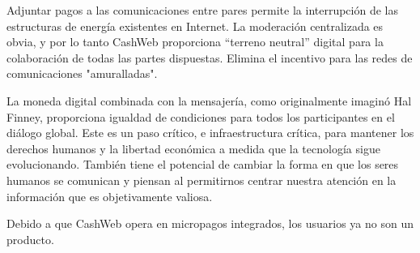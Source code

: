 \documentclass{article}
\begin{document}
Adjuntar pagos a las comunicaciones entre pares permite la interrupción de las estructuras de energía existentes en Internet. La moderación centralizada es obvia, y por lo tanto CashWeb proporciona ``terreno neutral'' digital para la colaboración de todas las partes dispuestas. Elimina el incentivo para las redes de comunicaciones "amuralladas".

La moneda digital combinada con la mensajería, como originalmente imaginó Hal Finney\supercite{finney2004rpow}, proporciona igualdad de condiciones para todos los participantes en el diálogo global. Este es un paso crítico, e infraestructura crítica, para mantener los derechos humanos y la libertad económica a medida que la tecnología sigue evolucionando. También tiene el potencial de cambiar la forma en que los seres humanos se comunican y piensan al permitirnos centrar nuestra atención en la información que es objetivamente valiosa.

Debido a que CashWeb opera en micropagos integrados, los usuarios ya no son un producto.

\printbibliography
\end{document}
